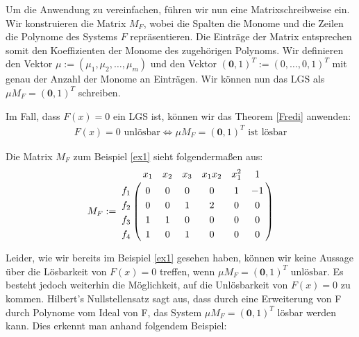 \noindent Um die Anwendung zu vereinfachen, führen wir nun eine Matrixschreibweise ein. Wir konstruieren die Matrix $M_F$, wobei die Spalten die Monome und die Zeilen die Polynome des Systems $F$ repräsentieren. Die Einträge der Matrix entsprechen somit den Koeffizienten der Monome des zugehörigen Polynoms.  Wir definieren den Vektor $\mu := (\mu_1,\mu_2,\ldots,\mu_m)$ und den Vektor $(\textbf{0},1)^T:=(0,\ldots,0,1)^T$ mit genau der Anzahl der Monome an Einträgen. Wir können nun das LGS als $\mu M_F = (\textbf{0},1)^T$ schreiben. 
\begin{note}
Im Fall, dass $F(x)=0$ ein LGS ist, können wir das Theorem \ref{Fredi} anwenden: 
\begin{align*}
F(x)=0 \text{ unlösbar} \Leftrightarrow \mu M_F = (\textbf{0},1)^T \text{ ist lösbar}
\end{align*}
\end{note}  

\begin{example}
Die Matrix $M_F$ zum Beispiel \ref{ex1} sieht folgendermaßen aus: 
\begin{align*}
M_F := \bordermatrix{
	& x_{1} & x_2 & x_3 & x_1x_2 & x_1^2 & 1 \cr
	f_1 & 0 & 0 & 0 & 0 & 1 & -1 \cr
	f_2 & 0 & 0 & 1 & 2 & 0 & 0 \cr
	f_3 & 1 & 1 & 0 & 0 & 0 & 0 \cr
	f_4 & 1 & 0 & 1 & 0 & 0 & 0
}
\end{align*}
\end{example}


\noindent Leider, wie wir bereits im Beispiel \ref{ex1} gesehen haben, können wir keine Aussage über die Lösbarkeit von $F(x) = 0$ treffen, wenn
$\mu M_F = (\textbf{0},1)^T \text{ unlösbar}$. Es besteht jedoch weiterhin die Möglichkeit, auf die Unlösbarkeit von $F(x) = 0$ zu kommen. Hilbert's Nullstellensatz sagt aus, dass durch eine Erweiterung von F durch Polynome vom Ideal von F, das System $\mu M_F = (\textbf{0},1)^T$ lösbar werden kann. Dies erkennt man anhand folgendem Beispiel:

